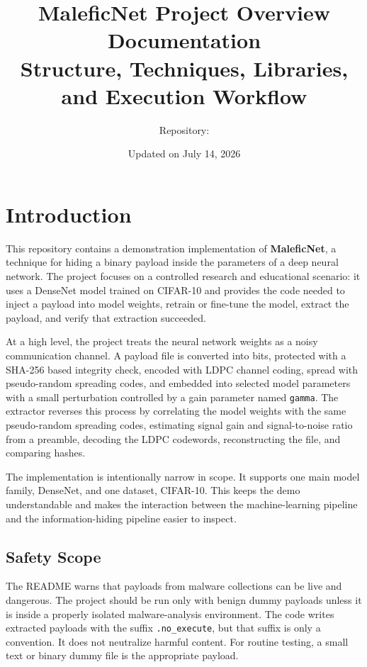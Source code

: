\documentclass[11pt,a4paper]{article}
\title{\textbf{MaleficNet Project Overview Documentation}\\
\large Structure, Techniques, Libraries, and Execution Workflow}
\author{Repository: \code{mlsec\_proj}}
\date{Updated on July 14, 2026}
\newcommand{\code}[1]{\texttt{#1}}
\begin{document}
\maketitle
\tableofcontents
\newpage

\section{Introduction}

This repository contains a demonstration implementation of \textbf{MaleficNet}, a technique for hiding a binary payload inside the parameters of a deep neural network. The project focuses on a controlled research and educational scenario: it uses a DenseNet model trained on CIFAR-10 and provides the code needed to inject a payload into model weights, retrain or fine-tune the model, extract the payload, and verify that extraction succeeded.

At a high level, the project treats the neural network weights as a noisy communication channel. A payload file is converted into bits, protected with a SHA-256 based integrity check, encoded with LDPC channel coding, spread with pseudo-random spreading codes, and embedded into selected model parameters with a small perturbation controlled by a gain parameter named \code{gamma}. The extractor reverses this process by correlating the model weights with the same pseudo-random spreading codes, estimating signal gain and signal-to-noise ratio from a preamble, decoding the LDPC codewords, reconstructing the file, and comparing hashes.

The implementation is intentionally narrow in scope. It supports one main model family, DenseNet, and one dataset, CIFAR-10. This keeps the demo understandable and makes the interaction between the machine-learning pipeline and the information-hiding pipeline easier to inspect.

\subsection{Safety Scope}

The README warns that payloads from malware collections can be live and dangerous. The project should be run only with benign dummy payloads unless it is inside a properly isolated malware-analysis environment. The code writes extracted payloads with the suffix \code{.no\_execute}, but that suffix is only a convention. It does not neutralize harmful content. For routine testing, a small text or binary dummy file is the appropriate payload.
\end{document}
